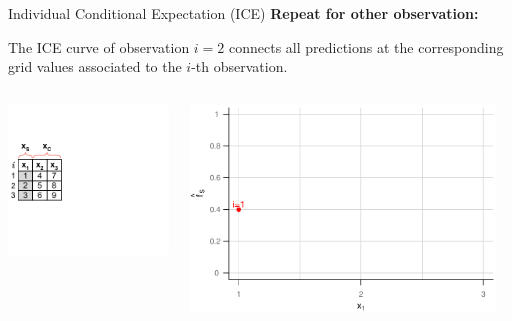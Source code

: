 \documentclass[11pt,compress,t,notes=noshow, aspectratio=169, xcolor=table]{beamer}
\begin{document}
\begin{vbframe}{Individual Conditional Expectation (ICE)}
\textbf{Repeat for other observation:}

The ICE curve of observation $i=2$ connects all predictions at the corresponding grid values associated to the $i$-th observation.

\framebreak

\begin{columns}[T]
\begin{column}{0.45\textwidth}
\includegraphics[page=7, trim=0cm 0.35cm 0.85cm 0.35cm, width=\textwidth]{figure_man/ice_plot_demo}
\end{column}
\begin{column}{0.55\textwidth}
\includegraphics[page=5, width=0.95\textwidth]{figure/ICE}
\end{column}
\end{columns}
\vspace*{\topsep}


\end{vbframe}
\end{document}
